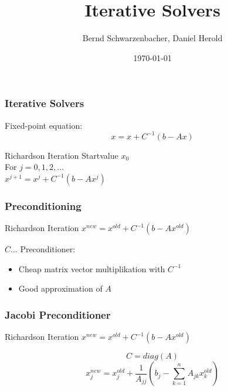 \documentclass{beamer}
\title[Iterative Solvers]{Iterative Solvers} %
\author{Bernd Schwarzenbacher, Daniel Herold} %
\institute[TU Wien] %
{Technical University of Vienna \\ %
\medskip
}
\date{\today} %
\begin{document}
\begin{frame}
\titlepage %
\end{frame}




\begin{frame}
\frametitle{Iterative Solvers}
Fixed-point equation:
$$x = x + C^{-1} (b-Ax)$$
\begin{block}{Richardson Iteration}
Startvalue $x_{0}$ \\
For $j = 0, 1, 2, \dots$ \\
\quad $x^{j+1} = x^{j} + C^{-1} (b - Ax^{j})$
\end{block}
\end{frame}

\begin{frame}
\frametitle{Preconditioning}
\begin{block}{Richardson Iteration}
$x^{new} = x^{old} + C^{-1} (b - Ax^{old})$
\end{block}
$C \dots$ Preconditioner:
\begin{itemize}
  \item Cheap matrix vector multiplikation with $C^{-1}$
  \item Good approximation of $A$
\end{itemize}
\end{frame}

\begin{frame}
\frametitle{Jacobi Preconditioner}
\begin{block}{Richardson Iteration}
$x^{new} = x^{old} + C^{-1} (b - Ax^{old})$
\end{block}
$$C = diag(A)$$
$$x_j^{new} = x_j^{old} + \frac{1}{A_{jj}} \left(b_{j} -
\sum_{k=1}^{n} A_{jk} x_k^{old}\right)$$
\end{frame}
\end{document}
